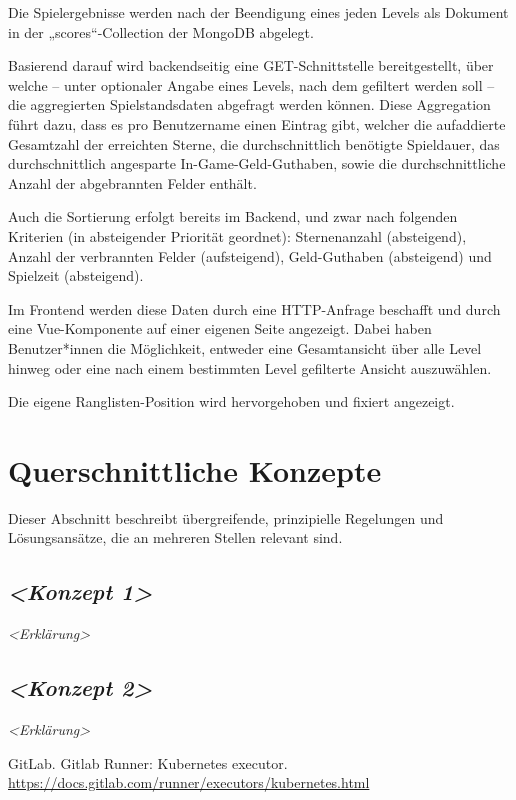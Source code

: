 \documentclass[letterpaper, 10 pt, conference]{ieeeconf}
\begin{document}
Die Spielergebnisse werden nach der Beendigung eines jeden Levels als Dokument in der „scores“-Collection der MongoDB abgelegt.

Basierend darauf wird backendseitig eine GET-Schnittstelle bereitgestellt,
über welche – unter optionaler Angabe eines Levels, nach dem gefiltert werden soll – die aggregierten Spielstandsdaten abgefragt werden können.
Diese Aggregation führt dazu, dass es pro Benutzername einen Eintrag gibt, welcher die aufaddierte Gesamtzahl der erreichten Sterne,
die durchschnittlich benötigte Spieldauer, das durchschnittlich angesparte In-Game-Geld-Guthaben, sowie die durchschnittliche Anzahl der abgebrannten Felder enthält.

Auch die Sortierung erfolgt bereits im Backend, und zwar nach folgenden Kriterien (in absteigender Priorität geordnet):
Sternenanzahl (absteigend), Anzahl der verbrannten Felder (aufsteigend), Geld-Guthaben (absteigend) und Spielzeit (absteigend).

Im Frontend werden diese Daten durch eine HTTP-Anfrage beschafft und durch eine Vue-Komponente auf einer eigenen Seite angezeigt.
Dabei haben Benutzer*innen die Möglichkeit, entweder eine Gesamtansicht über alle Level hinweg oder eine nach einem bestimmten Level gefilterte Ansicht auszuwählen.

Die eigene Ranglisten-Position wird hervorgehoben und fixiert angezeigt.

\section{Querschnittliche Konzepte}

Dieser Abschnitt beschreibt übergreifende, prinzipielle Regelungen und
Lösungsansätze, die an mehreren Stellen relevant sind.

\subsection{\texorpdfstring{\emph{\textless Konzept
1\textgreater{}}}{\textless Konzept 1\textgreater{}}}

\emph{\textless Erklärung\textgreater{}}

\subsection{\texorpdfstring{\emph{\textless Konzept
2\textgreater{}}}{\textless Konzept 2\textgreater{}}}

\emph{\textless Erklärung\textgreater{}}

\begin{thebibliography}{99}

 GitLab.  Gitlab Runner: Kubernetes executor.   \url{https://docs.gitlab.com/runner/executors/kubernetes.html}

\end{thebibliography}


\addtolength{\textheight}{-12cm}
\end{document}
